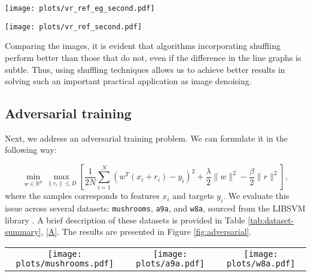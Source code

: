 \documentclass{article}
\begin{document}
\vspace{-3mm}
\begin{center}
\texttt{[image: plots/vr\_ref\_eg\_second.pdf]}
\vspace{-4mm}
\label{fig:eggirl}
\end{center}
\vspace{-4mm}
\begin{center}
\texttt{[image: plots/vr\_ref\_second.pdf]}
\vspace{-4mm}
\label{fig:mpvrgirl}
\end{center}
\vspace{-3mm}
Comparing the images, it is evident that algorithms incorporating shuffling perform better than those that do not, even if the difference in the line graphs is subtle. Thus, using shuffling techniques allows us to achieve better results in solving such an important practical application as image denoising.
\subsection{Adversarial training}

Next, we address an adversarial training problem. We can formulate it in the following way: 

\vspace{-2mm}
\begin{equation} \label{problem_adversarial}
\min_{w \in \mathbb{R}^d} \max_{\|r_i\| \leqslant D} \left[\frac{1}{2N} \sum \limits_{i=1}^N \left( w^T\left(x_i+r_i\right) - y_i\right) ^2 + \frac{\lambda}{2} \|w\|^2 -\frac{\beta}{2}\|r\|^2\right],
\end{equation}
where the samples corresponds to features $x_i$ and targets $y_i$. We evaluate this issue across several datasets: \texttt{mushrooms}, \texttt{a9a}, and \texttt{w8a}, sourced from the \textsc{LIBSVM} library \citep{chang2011libsvm}. A brief description of these datasets is provided in Table \ref{tab:dataset-summary}, \ref{A}. The results are presented in Figure \ref{fig:adversarial}.
\begin{center}
\centering
\begin{tabular}{ccc}
\texttt{[image: plots/mushrooms.pdf]} &
\texttt{[image: plots/a9a.pdf]} &
\texttt{[image: plots/w8a.pdf]} 
\end{tabular}
\label{fig:adversarial}
\end{center}
\end{document}
